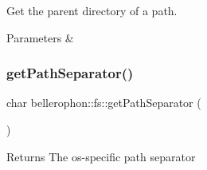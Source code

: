 Get the parent directory of a path. 


\begin{DoxyParams}{Parameters}
{\em } & \\
\hline
\end{DoxyParams}
\hypertarget{namespacebellerophon_1_1fs_a5fdf1fe521ee409381f36acf1457a858}{}\label{namespacebellerophon_1_1fs_a5fdf1fe521ee409381f36acf1457a858} 
\subsubsection{\texorpdfstring{get\+Path\+Separator()}{getPathSeparator()}}
{\footnotesize\ttfamily char bellerophon\+::fs\+::get\+Path\+Separator (\begin{DoxyParamCaption}{ }\end{DoxyParamCaption})}

\begin{DoxyReturn}{Returns}
The os-\/specific path separator 
\end{DoxyReturn}
